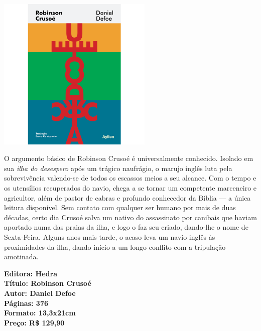 \pagebreak

\begin{center}
\hspace*{-3.6cm}
\hspace*{3.1cm}\includegraphics[width=74mm]{./grid/robinson.png}
\end{center}

\hspace*{-7cm}\hrulefill\hspace*{-7cm}

\medskip

\noindent{}O argumento básico de Robinson Crusoé é universalmente conhecido. Isolado em sua \textit{ilha do desespero} após um trágico naufrágio, o marujo inglês luta pela sobrevivência valendo-se de todos os escassos meios a seu alcance. Com o tempo e os utensílios recuperados do navio, chega a se tornar um competente marceneiro e agricultor, além de pastor de cabras e profundo conhecedor da Bíblia --- a única leitura disponível. Sem contato com qualquer ser humano por mais de duas décadas, certo dia Crusoé salva um nativo do assassinato por canibais que haviam aportado numa das praias da ilha, e logo o faz seu criado, dando-lhe o nome de Sexta-Feira. Alguns anos mais tarde, o acaso leva um navio inglês às proximidades da ilha, dando início a um longo conflito com a tripulação amotinada.

\vfill

\noindent\begin{minipage}[c]{1\linewidth}
{\small\textbf{
\hspace*{-.1cm}Editora: Hedra\\
Título: Robinson Crusoé\\
Autor: Daniel Defoe\\ 
Páginas: 376\\
Formato: 13,3x21cm\\
Preço: R\$ 129,90\\
}}
\end{minipage}

